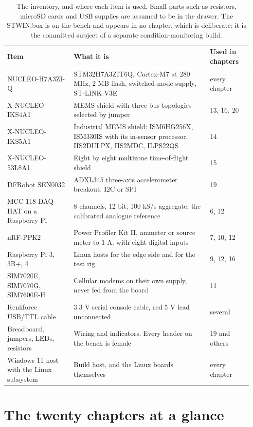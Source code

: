 \begin{table}[H]\centering\small
\begin{tabular}{p{42mm}p{74mm}p{34mm}}
\toprule
Item & What it is & Used in chapters \\
\midrule
NUCLEO-H7A3ZI-Q & STM32H7A3ZIT6Q, Cortex-M7 at 280 MHz, 2 MB flash, switched-mode supply, ST-LINK V3E & every chapter \\
X-NUCLEO-IKS4A1 & MEMS shield with three bus topologies selected by jumper & 13, 16, 20 \\
X-NUCLEO-IKS5A1 & Industrial MEMS shield: ISM6HG256X, ISM330IS with its in-sensor processor, IIS2DULPX, IIS2MDC, ILPS22QS & 14 \\
X-NUCLEO-53L8A1 & Eight by eight multizone time-of-flight shield & 15 \\
DFRobot SEN0032 & ADXL345 three-axis accelerometer breakout, I2C or SPI & 19 \\
MCC 118 DAQ HAT on a Raspberry Pi & 8 channels, 12 bit, 100 kS/s aggregate, the calibrated analogue reference & 6, 12 \\
nRF-PPK2 & Power Profiler Kit II, ammeter or source meter to 1 A, with eight digital inputs & 7, 10, 12 \\
Raspberry Pi 3, 3B+, 4 & Linux hosts for the edge side and for the test rig & 9, 12, 16 \\
SIM7020E, SIM7070G, SIM7600E-H & Cellular modems on their own supply, never fed from the board & 11 \\
Renkforce USB/TTL cable & 3.3 V serial console cable, red 5 V lead unconnected & several \\
Breadboard, jumpers, LEDs, resistors & Wiring and indicators. Every header on the bench is female & 19 and others \\
Windows 11 host with the Linux subsystem & Build host, and the Linux boards themselves & every chapter \\
\bottomrule
\end{tabular}
\caption{The inventory, and where each item is used. Small parts such as resistors, microSD cards and USB supplies are assumed to be in the drawer. The STWIN.box is on the bench and appears in no chapter, which is deliberate: it is the committed subject of a separate condition-monitoring build.}
\end{table}

\section*{The twenty chapters at a glance}

